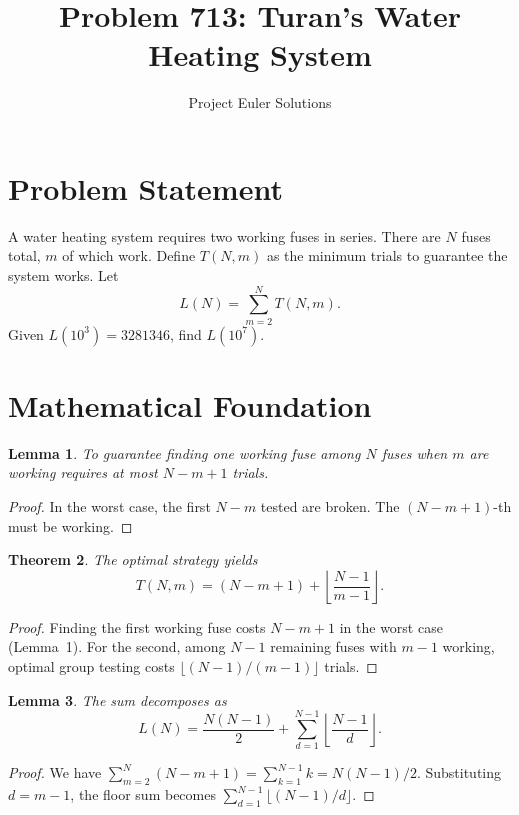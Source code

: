 \documentclass[11pt]{article}
\title{Problem 713: Turan's Water Heating System}
\author{Project Euler Solutions}
\date{}
\newtheorem{theorem}{Theorem}
\newtheorem{lemma}[theorem]{Lemma}
\begin{document}
\maketitle

\section{Problem Statement}

A water heating system requires two working fuses in series. There are $N$ fuses total, $m$ of which work. Define $T(N,m)$ as the minimum trials to guarantee the system works. Let
\[
L(N) = \sum_{m=2}^{N} T(N,m).
\]
Given $L(10^3) = 3281346$, find $L(10^7)$.

\section{Mathematical Foundation}

\begin{lemma}
To guarantee finding one working fuse among $N$ fuses when $m$ are working requires at most $N - m + 1$ trials.
\end{lemma}

\begin{proof}
In the worst case, the first $N-m$ tested are broken. The $(N-m+1)$-th must be working.
\end{proof}

\begin{theorem}
The optimal strategy yields
\[
T(N,m) = (N - m + 1) + \left\lfloor \frac{N-1}{m-1} \right\rfloor.
\]
\end{theorem}

\begin{proof}
Finding the first working fuse costs $N-m+1$ in the worst case (Lemma~1). For the second, among $N-1$ remaining fuses with $m-1$ working, optimal group testing costs $\lfloor(N-1)/(m-1)\rfloor$ trials.
\end{proof}

\begin{lemma}
The sum decomposes as
\[
L(N) = \frac{N(N-1)}{2} + \sum_{d=1}^{N-1} \left\lfloor \frac{N-1}{d} \right\rfloor.
\]
\end{lemma}

\begin{proof}
We have $\sum_{m=2}^{N}(N-m+1) = \sum_{k=1}^{N-1} k = N(N-1)/2$. Substituting $d = m-1$, the floor sum becomes $\sum_{d=1}^{N-1}\lfloor(N-1)/d\rfloor$.
\end{proof}
\end{document}
